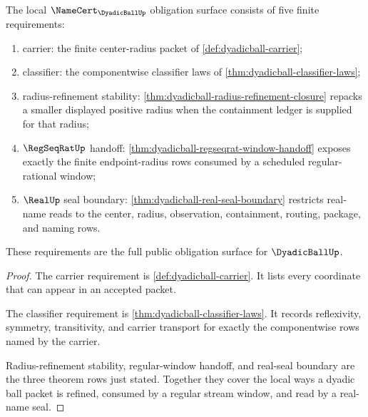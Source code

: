 \begin{theorem}
\label{thm:dyadicball-namecert-obligation-surface}
The local $\NameCert_{\DyadicBallUp}$ obligation surface consists of five
finite requirements:
\begin{enumerate}
\item carrier: the finite center-radius packet of
\autoref{def:dyadicball-carrier};
\item classifier: the componentwise classifier laws of
\autoref{thm:dyadicball-classifier-laws};
\item radius-refinement stability:
\autoref{thm:dyadicball-radius-refinement-closure} repacks a smaller displayed
positive radius when the containment ledger is supplied for that radius;
\item $\RegSeqRatUp$ handoff:
\autoref{thm:dyadicball-regseqrat-window-handoff} exposes exactly the finite
endpoint-radius rows consumed by a scheduled regular-rational window;
\item $\RealUp$ seal boundary:
\autoref{thm:dyadicball-real-seal-boundary} restricts real-name reads to the
center, radius, observation, containment, routing, package, and naming rows.
\end{enumerate}
These requirements are the full public obligation surface for
$\DyadicBallUp$.
\end{theorem}
\begin{proof}
The carrier requirement is \autoref{def:dyadicball-carrier}. It lists every
coordinate that can appear in an accepted packet.

The classifier requirement is \autoref{thm:dyadicball-classifier-laws}. It
records reflexivity, symmetry, transitivity, and carrier transport for exactly
the componentwise rows named by the carrier.

Radius-refinement stability, regular-window handoff, and real-seal boundary
are the three theorem rows just stated. Together they cover the local ways a
dyadic ball packet is refined, consumed by a regular stream window, and read by
a real-name seal.
\end{proof}

